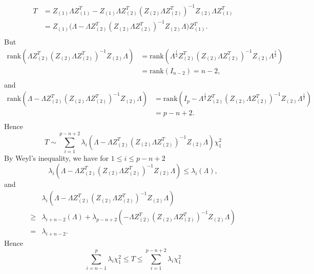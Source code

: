 \begin{equation}
    \begin{aligned}
        T&=Z_{(1)}\Lambda Z_{(1)}^T-Z_{(1)}\Lambda Z_{(2)}^T{(Z_{(2)}\Lambda Z_{(2)}^T)}^{-1}Z_{(2)}\Lambda Z_{(1)}^T\\
        &=Z_{(1)}\big(\Lambda -\Lambda Z_{(2)}^T{(Z_{(2)}\Lambda Z_{(2)}^T)}^{-1}Z_{(2)}\Lambda \big)Z_{(1)}^T.\\
    \end{aligned}
\end{equation}
But
    \begin{equation}
        \begin{aligned}
    \textrm{rank}(\Lambda Z_{(2)}^T{(Z_{(2)}\Lambda Z_{(2)}^T)}^{-1}Z_{(2)}\Lambda)
            &=\textrm{rank}(\Lambda^{\frac{1}{2}} Z_{(2)}^T{(Z_{(2)}\Lambda Z_{(2)}^T)}^{-1}Z_{(2)}\Lambda^{\frac{1}{2}})\\
            &=\textrm{rank}(I_{n-2})=n-2,\\
        \end{aligned}
    \end{equation}
and
    \begin{equation}
        \begin{aligned}
    \textrm{rank}(\Lambda-\Lambda Z_{(2)}^T{(Z_{(2)}\Lambda Z_{(2)}^T)}^{-1}Z_{(2)}\Lambda)
            &=\textrm{rank}(I_p-\Lambda^{\frac{1}{2}} Z_{(2)}^T{(Z_{(2)}\Lambda Z_{(2)}^T)}^{-1}Z_{(2)}\Lambda^{\frac{1}{2}})\\
            &=p-n+2.\\
        \end{aligned}
    \end{equation}
    Hence
    \[
        T\sim\sum_{i=1}^{p-n+2} \lambda_{i}(\Lambda -\Lambda Z_{(2)}^T{(Z_{(2)}\Lambda Z_{(2)}^T)}^{-1}Z_{(2)}\Lambda) \chi^2_1
        \]
By Weyl's inequality, we have for $1\leq i\leq p-n+2$
\begin{equation}
    \lambda_i(\Lambda -\Lambda Z_{(2)}^T{(Z_{(2)}\Lambda Z_{(2)}^T)}^{-1}Z_{(2)}\Lambda)
    \leq \lambda_i(\Lambda),
\end{equation}
and
\begin{equation}
    \begin{aligned}
        &\lambda_i(\Lambda -\Lambda Z_{(2)}^T{(Z_{(2)}\Lambda Z_{(2)}^T)}^{-1}Z_{(2)}\Lambda)\\
        \geq& \lambda_{i+n-2}(\Lambda)+\lambda_{p-n+2}(-\Lambda Z_{(2)}^T{(Z_{(2)}\Lambda Z_{(2)}^T)}^{-1}Z_{(2)}\Lambda)\\
        =& \lambda_{i+n-2}.
    \end{aligned}
\end{equation}
Hence
\[
    \sum_{i=n-1}^p \lambda_i \chi^2_1\leq T\leq\sum_{i=1}^{p-n+2}\lambda_i \chi^2_1
    \]

